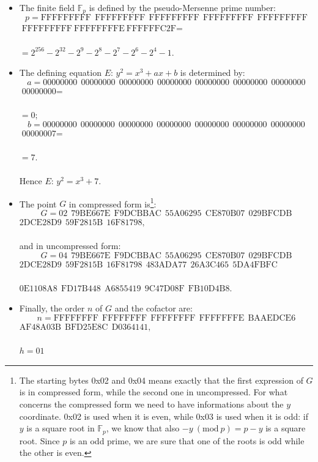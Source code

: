 \begin{itemize}
	\item The finite field $\mathbb{F}_p$ is defined by the pseudo-Mersenne prime number: 
	$$p = \text{FFFFFFFFF} \ \ \text{FFFFFFFFF} \ \ \text{FFFFFFFFF} \ \ \text{FFFFFFFFF} \ \ \text{FFFFFFFFF}$$ 
	$\text{FFFFFFFFF} \ \text{FFFFFFFFE} \ \text{FFFFFFC2F} =$
	\\
	\\
	$= 2^{256} - 2^{32} - 2^9 - 2^8 - 2^7 - 2^6 - 2^4 - 1.$
	\item The defining equation $E$: $y^2 = x^3 + ax + b$ is determined by:
	$$a = \text{00000000} \ \ \text{00000000} \ \ \text{00000000} \ \ \text{00000000} \ \ \text{00000000} \ \ \text{00000000} \ \ \text{00000000}$$
	$ \text{00000000} =$
	\\
	\\
	$= 0;$
	$$b = \text{00000000} \ \ \text{00000000} \ \ \text{00000000} \ \ \text{00000000} \ \ \text{00000000} \ \ \text{00000000} \ \ \text{00000000}$$
	$ \text{00000007} =$
	\\
	\\
	$= 7.$
	\\
	\\
	Hence $E$:	$y^2 = x^3 + 7$.
	\item The point $G$ in compressed form is\footnote{The starting bytes 0x02 and 0x04 means exactly that the first expression of $G$ is in compressed form, while the second one in uncompressed. For what concerns the compressed form we need to have informations about the $y$ coordinate. 0x02 is used when it is even, while 0x03 is used when it is odd: if $y$ is a square root in $\mathbb{F}_p$, we know that also $-y \ (\text{mod} \ p) = p - y$ is a square root. Since $p$ is an odd prime, we are sure that one of the roots is odd while the other is even.}:
	$$G = \text{02} \ \ \text{79BE667E} \ \ \text{F9DCBBAC} \ \ \text{55A06295} \ \ \text{CE870B07} \ \ \text{029BFCDB}$$ 
	$\text{2DCE28D9} \ \ \text{59F2815B} \ \ \text{16F81798},$
	\\
	\\
	and in uncompressed form:
	$$G = \text{04} \ \ \text{79BE667E} \ \ \text{F9DCBBAC} \ \ \text{55A06295} \ \ \text{CE870B07} \ \ \text{029BFCDB}$$ 
	$\text{2DCE28D9} \ \ \text{59F2815B} \ \ \text{16F81798} \ \ \text{483ADA77} \ \ \text{26A3C465} \ \ \text{5DA4FBFC}$
	\\
	\\
	$\text{0E1108A8} \ \ \text{FD17B448} \ \ \text{A6855419} \ \ \text{9C47D08F} \ \ \text{FB10D4B8}$.
	\item Finally, the order $n$ of $G$ and the cofactor are:
	$$n = \text{FFFFFFFF} \ \ \text{FFFFFFFF} \ \ \text{FFFFFFFF} \ \ \text{FFFFFFFE} \ \ \text{BAAEDCE6}$$
	$\text{AF48A03B} \ \ \text{BFD25E8C} \ \ \text{D0364141},$
	\\
	\\
	$h = \text{01}$
\end{itemize}

